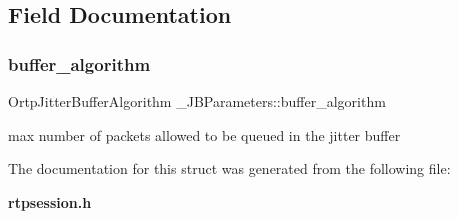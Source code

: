 \subsection{Field Documentation}
\mbox{\label{struct__JBParameters_ad4bf57ea281593ed5cbce2621e08333e}} 
\subsubsection{buffer\+\_\+algorithm}
{\footnotesize\ttfamily Ortp\+Jitter\+Buffer\+Algorithm \+\_\+\+J\+B\+Parameters\+::buffer\+\_\+algorithm}

max number of packets allowed to be queued in the jitter buffer 

The documentation for this struct was generated from the following file\+:\begin{DoxyCompactItemize}
\item 
\textbf{ rtpsession.\+h}\end{DoxyCompactItemize}
